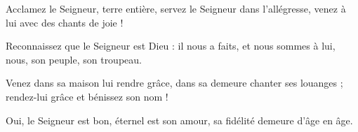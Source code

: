 \item Acclamez le Seigneur, terre entière,
servez le Seigneur dans l'allégresse, venez à lui avec des chants de joie !

\item Reconnaissez que le Seigneur est Dieu : il nous a faits, et nous sommes à lui, nous, son peuple, son troupeau.

\item Venez dans sa maison lui rendre grâce, dans sa demeure chanter ses louanges ; rendez-lui grâce et bénissez son nom !

\item Oui, le Seigneur est bon, éternel est son amour, sa fidélité demeure d'âge en âge.